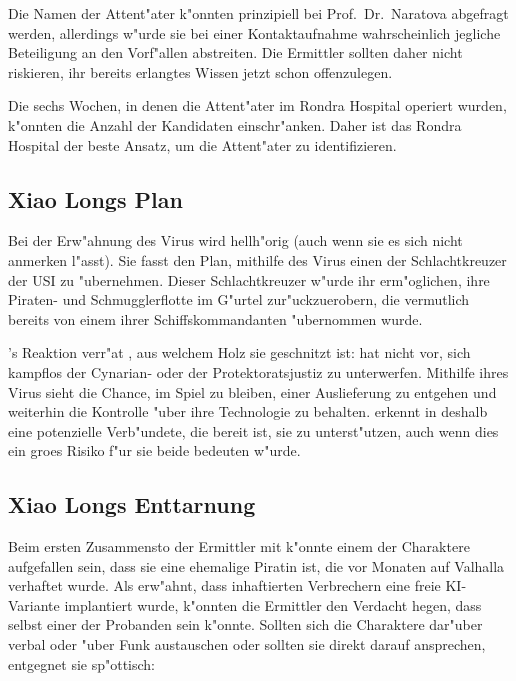 \begin{remarks}
	Die Namen der Attent"ater k"onnten prinzipiell bei Prof.~Dr.~Naratova abgefragt werden, allerdings w"urde sie bei einer Kontaktaufnahme wahrscheinlich jegliche Beteiligung an den Vorf"allen abstreiten. Die Ermittler sollten daher nicht riskieren, ihr bereits erlangtes Wissen jetzt schon offenzulegen.

	Die sechs Wochen, in denen die Attent"ater im Rondra Hospital operiert wurden, k"onnten die Anzahl der Kandidaten einschr"anken. Daher ist das Rondra Hospital der beste Ansatz, um die Attent"ater zu identifizieren.	
\end{remarks}

\subsection[\xl{}s Plan]{Xiao Longs Plan}
Bei der Erw"ahnung des Virus wird \xl{} hellh"orig (auch wenn sie es sich nicht anmerken l"asst). Sie fasst den Plan, mithilfe des Virus einen der Schlachtkreuzer der USI zu "ubernehmen. Dieser Schlachtkreuzer w"urde ihr erm"oglichen, ihre Piraten- und Schmugglerflotte im G"urtel zur"uckzuerobern, die vermutlich bereits von einem ihrer Schiffskommandanten "ubernommen wurde. 

\ml{}’s Reaktion verr"at \xl{}, aus welchem Holz sie geschnitzt ist: \ml{} hat nicht vor, sich kampflos der Cynarian- oder der Protektoratsjustiz zu unterwerfen. Mithilfe ihres Virus sieht \ml{} die Chance, im Spiel zu bleiben, einer Auslieferung zu entgehen und weiterhin die Kontrolle "uber ihre Technologie zu behalten. \xl{} erkennt in \ml{} deshalb eine potenzielle Verb"undete, die bereit ist, sie zu unterst"utzen, auch wenn dies ein gro\3es Risiko f"ur sie beide bedeuten w"urde.

\subsection[\xl{}s Enttarnung]{Xiao Longs Enttarnung}
Beim ersten Zusammensto\3 der Ermittler mit \xl{} k"onnte einem der Charaktere aufgefallen sein, dass sie eine ehemalige Piratin ist, die vor Monaten auf Valhalla verhaftet wurde. Als \ml{} erw"ahnt, dass inhaftierten Verbrechern eine freie KI-Variante implantiert wurde, k"onnten die Ermittler den Verdacht hegen, dass \xl{} selbst einer der Probanden sein k"onnte. Sollten sich die Charaktere dar"uber verbal oder "uber Funk austauschen oder sollten sie \xl{} direkt darauf ansprechen, entgegnet sie sp"ottisch:

